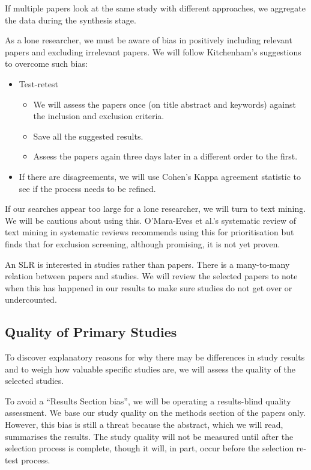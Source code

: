 If multiple papers look at the same study with different approaches, we aggregate the data during the synthesis stage.

As a lone researcher, we must be aware of bias in positively including relevant papers and excluding irrelevant papers.
We will follow Kitchenham's suggestions to overcome such bias:
\begin{itemize}
    \setlength\itemsep{0em}
    \item Test-retest 
    \begin{itemize}
        \setlength\itemsep{0em}
        \item We will assess the papers once (on title abstract and keywords) against the inclusion and exclusion criteria.
        \item Save all the suggested results.
        \item Assess the papers again three days later in a different order to the first.  
    \end{itemize}
    \item If there are disagreements, we will use Cohen's\cite{Cohen_1960} Kappa agreement statistic to see if the process needs to be refined.
\end{itemize} 

If our searches appear too large for a lone researcher, we will turn to text mining.
We will be cautious about using this.
O'Mara-Eves et al.'s\cite{OMara-Eves_2015} systematic review of text mining in systematic reviews recommends using this for prioritisation but finds that for exclusion screening, although promising, it is not yet proven.

An SLR is interested in studies rather than papers.
There is a many-to-many relation between papers and studies.
We will review the selected papers to note when this has happened in our results to make sure studies do not get over or undercounted.

\subsection{Quality of Primary Studies}
To discover explanatory reasons for why there may be differences in study results and to weigh how valuable specific studies are, we will assess the quality of the selected studies.

To avoid a ``Results Section bias'', we will be operating a results-blind quality assessment.
We base our study quality on the methods section of the papers only.
However, this bias is still a threat because the abstract, which we will read, summarises the results.
The study quality will not be measured until after the selection process is complete, though it will, in part, occur before the selection re-test process.

